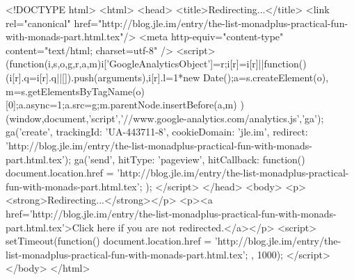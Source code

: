 <!DOCTYPE html>
<html>
<head>
<title>Redirecting...</title>
<link rel="canonical" href="http://blog.jle.im/entry/the-list-monadplus-practical-fun-with-monads-part.html.tex"/>
<meta http-equiv="content-type" content="text/html; charset=utf-8" />
<script>
(function(i,s,o,g,r,a,m){i['GoogleAnalyticsObject']=r;i[r]=i[r]||function(){
(i[r].q=i[r].q||[]).push(arguments)},i[r].l=1*new Date();a=s.createElement(o),
m=s.getElementsByTagName(o)[0];a.async=1;a.src=g;m.parentNode.insertBefore(a,m)
})(window,document,'script','//www.google-analytics.com/analytics.js','ga');
ga('create', { trackingId: 'UA-443711-8', cookieDomain: 'jle.im', redirect: 'http://blog.jle.im/entry/the-list-monadplus-practical-fun-with-monads-part.html.tex'});
ga('send', { hitType: 'pageview', hitCallback: function() { document.location.href = 'http://blog.jle.im/entry/the-list-monadplus-practical-fun-with-monads-part.html.tex'; } });
</script>
</head>
<body>
  <p><strong>Redirecting...</strong></p>
  <p><a href='http://blog.jle.im/entry/the-list-monadplus-practical-fun-with-monads-part.html.tex'>Click here if you are not redirected.</a></p>
  <script>
    setTimeout(function() { document.location.href = 'http://blog.jle.im/entry/the-list-monadplus-practical-fun-with-monads-part.html.tex'; }, 1000);
  </script>
</body>
</html>
